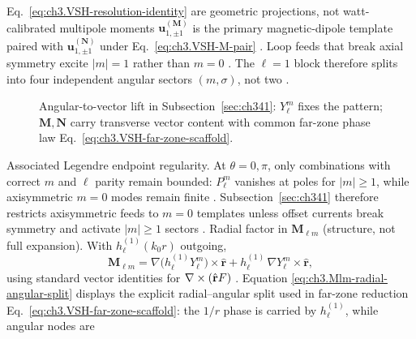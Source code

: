 Eq.~\eqref{eq:ch3.VSH-resolution-identity} are geometric projections, not watt-calibrated multipole moments
\(\mathbf{u}_{1,\pm1}^{(\mathbf{M})}\) is the primary magnetic-dipole template paired with
\(\mathbf{u}_{1,\pm1}^{(\mathbf{N})}\) under Eq.~\eqref{eq:ch3.VSH-M-pair} . Loop feeds
that break axial symmetry excite \(|m|=1\) rather than \(m=0\) . The \(\ell=1\) block therefore
splits into four independent angular sectors \((m,\sigma)\), not two .
\begin{figure}[t]
\centering
{}
\caption{Angular-to-vector lift in Subsection~\ref{sec:ch341}: \(Y_{\ell}^{m}\) fixes the pattern; \(\mathbf{M},\mathbf{N}\)
carry transverse vector content with common far-zone phase law Eq.~\eqref{eq:ch3.VSH-far-zone-scaffold}.}
\label{fig:ch3.341-scalar-vector-lift}
\end{figure}
Associated Legendre endpoint regularity. At \(\theta=0,\pi\), only combinations with correct \(m\) and \(\ell\) parity remain bounded:
\(P_{\ell}^{m}\) vanishes at poles for \(|m|\ge1\), while axisymmetric \(m=0\) modes remain finite
. Subsection~\ref{sec:ch341} therefore restricts axisymmetric feeds to \(m=0\) templates
unless offset currents break symmetry and activate \(|m|\ge1\) sectors .
Radial factor in \(\mathbf{M}_{\ell m}\) (structure, not full expansion). With \(h_{\ell}^{(1)}(k_{0}r)\) outgoing,
\begin{equation}
\label{eq:ch3.Mlm-radial-angular-split}
\mathbf{M}_{\ell m}
=
\nabla\!\big(h_{\ell}^{(1)}Y_{\ell}^{m}\big)\times\hat{\mathbf{r}}
+
h_{\ell}^{(1)}\,\nabla Y_{\ell}^{m}\times\hat{\mathbf{r}},
\end{equation}
using standard vector identities for \(\nabla\times(\hat{\mathbf{r}}F)\) . Equation
\eqref{eq:ch3.Mlm-radial-angular-split} displays the explicit radial--angular split used in far-zone reduction
Eq.~\eqref{eq:ch3.VSH-far-zone-scaffold}: the \(1/r\) phase is carried by \(h_{\ell}^{(1)}\), while angular nodes are
